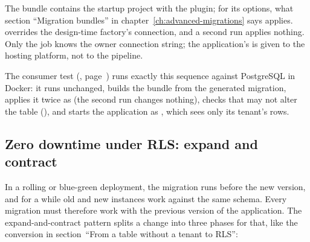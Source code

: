 
The bundle contains the startup project with the plugin; for its options, what section
“Migration bundles” in chapter~\ref{ch:advanced-migrations} says applies.
 overrides the design-time factory's connection, and a second run applies
nothing. Only the  job knows the owner connection string; the application's is
given to the hosting platform, not to the pipeline.

The consumer test (, page~\pageref{sec:consumer-test}) runs exactly this sequence against PostgreSQL in Docker: it runs
 unchanged, builds the bundle from the generated
migration, applies it twice as  (the second run changes
nothing), checks that  may not alter the table
(), and starts the application as , which sees
only its tenant's rows.

\subsection*{Zero downtime under RLS: expand and contract}

In a rolling or blue-green deployment, the migration runs before the new version, and for a
while old and new instances work against the same schema. Every migration must therefore work
with the previous version of the application. The expand-and-contract pattern splits a change
into three phases for that, like the conversion in section~“From a table without a tenant to
RLS”:

